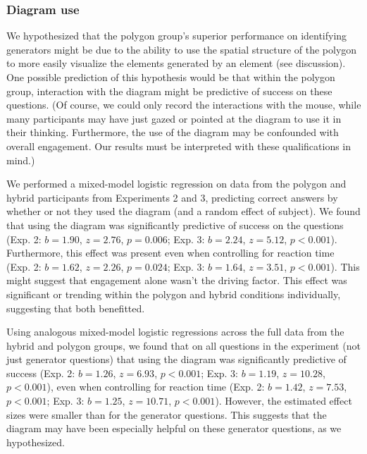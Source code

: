 \documentclass[man,10pt]{apa6}
\begin{document}
\subsubsection{Diagram use}
We hypothesized that the polygon group's superior performance on identifying generators might be due to the ability to use the spatial structure of the polygon to more easily visualize the elements generated by an element (see discussion). One possible prediction of this hypothesis would be that within the polygon group, interaction with the diagram might be predictive of success on these questions. (Of course, we could only record the interactions with the mouse, while many participants may have just gazed or pointed at the diagram to use it in their thinking. Furthermore, the use of the diagram may be confounded with overall engagement. Our results must be interpreted with these qualifications in mind.) \par
We performed a mixed-model logistic regression on data from the polygon and hybrid participants from Experiments 2 and 3, predicting correct answers by whether or not they used the diagram (and a random effect of subject). We found that using the diagram was significantly predictive of success on the questions (Exp. 2: $b=1.90$, $z = 2.76$, $p = 0.006$; Exp. 3: $b=2.24$, $z = 5.12$, $p < 0.001$). Furthermore, this effect was present even when controlling for reaction time (Exp. 2: $b = 1.62$, $z = 2.26$, $p = 0.024$; Exp. 3: $b = 1.64$, $z = 3.51$, $p < 0.001$). This might suggest that engagement alone wasn't the driving factor. This effect was significant or trending within the polygon and hybrid conditions individually, suggesting that both benefitted. \par
Using analogous mixed-model logistic regressions across the full data from the hybrid and polygon groups, we found that on all questions in the experiment (not just generator questions) that using the diagram was significantly predictive of success (Exp. 2: $b = 1.26$, $z = 6.93$, $p < 0.001$; Exp. 3: $b = 1.19$, $z= 10.28$, $p < 0.001$), even when controlling for reaction time (Exp. 2: $b = 1.42$, $z = 7.53$, $p < 0.001$; Exp. 3: $b = 1.25$, $z = 10.71$, $p < 0.001$). However, the estimated effect sizes were smaller than for the generator questions. This suggests that the diagram may have been especially helpful on these generator questions, as we hypothesized. 
\end{document}
